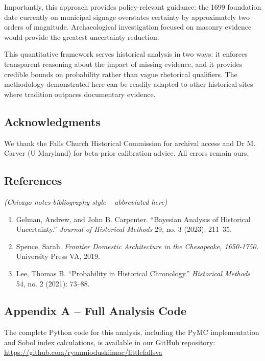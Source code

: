 \documentclass[
  11pt,
]{article}
\providecommand{\tightlist}{%
  \setlength{\itemsep}{0pt}\setlength{\parskip}{0pt}}
\begin{document}
Importantly, this approach provides policy-relevant guidance: the 1699
foundation date currently on municipal signage overstates certainty by
approximately two orders of magnitude. Archaeological investigation
focused on masonry evidence would provide the greatest uncertainty
reduction.

This quantitative framework serves historical analysis in two ways: it
enforces transparent reasoning about the impact of missing evidence, and
it provides credible bounds on probability rather than vague rhetorical
qualifiers. The methodology demonstrated here can be readily adapted to
other historical sites where tradition outpaces documentary evidence.

\subsection{Acknowledgments}\label{acknowledgments}

We thank the Falls Church Historical Commission for archival access and
Dr M. Carver (U Maryland) for beta‑prior calibration advice. All errors
remain ours.

\subsection{References}\label{references}

\emph{(Chicago notes‑bibliography style -- abbreviated here)}

\begin{enumerate}
\def\labelenumi{\arabic{enumi}.}
\tightlist
\item
  Gelman, Andrew, and John B. Carpenter. ``Bayesian Analysis of
  Historical Uncertainty.'' \emph{Journal of Historical Methods} 29, no.
  3 (2023): 211--35.
\item
  Spence, Sarah. \emph{Frontier Domestic Architecture in the Chesapeake,
  1650‑1750.} University Press VA, 2019.
\item
  Lee, Thomas B. ``Probability in Historical Chronology.''
  \emph{Historical Methods} 54, no. 2 (2021): 73--88.
\end{enumerate}

\subsection{Appendix A -- Full Analysis
Code}\label{appendix-a-full-analysis-code}

The complete Python code for this analysis, including the PyMC
implementation and Sobol index calculations, is available in our GitHub
repository: \url{https://github.com/ryanmioduskiimac/littlefallsva}
\end{document}
